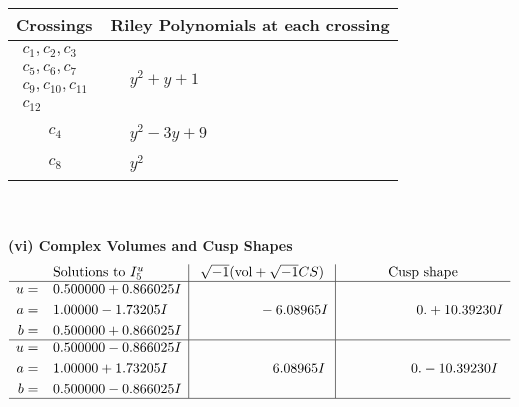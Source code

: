 \documentclass[1p]{elsarticle_modified}
\theoremstyle{definition}
\newcommand{\I}{\sqrt{-1}}
\begin{document}
\begin{tabular}{m{50pt}|m{274pt}}
Crossings & \hspace{64pt}Riley Polynomials at each crossing \\
\hline $$\begin{aligned}c_{1},c_{2},c_{3}\\c_{5},c_{6},c_{7}\\c_{9},c_{10},c_{11}\\c_{12}\end{aligned}$$&$\begin{aligned}
&y^2+y+1
\end{aligned}$\\
\hline $$\begin{aligned}c_{4}\end{aligned}$$&$\begin{aligned}
&y^2-3 y+9
\end{aligned}$\\
\hline $$\begin{aligned}c_{8}\end{aligned}$$&$\begin{aligned}
&y^2
\end{aligned}$\\
\hline
\end{tabular}\\~\\
\newpage\flushleft \textbf{(vi) Complex Volumes and Cusp Shapes}
$$\begin{array}{c|c|c}  
\text{Solutions to }I^u_{5}& \I (\text{vol} + \sqrt{-1}CS) & \text{Cusp shape}\\
 \hline 
\begin{aligned}
u &= \phantom{-}0.500000 + 0.866025 I \\
a &= \phantom{-}1.00000 - 1.73205 I \\
b &= \phantom{-}0.500000 + 0.866025 I\end{aligned}
 & \phantom{-0.000000 } -6.08965 I & \phantom{-0.000000 -}0. + 10.39230 I \\ \hline\begin{aligned}
u &= \phantom{-}0.500000 - 0.866025 I \\
a &= \phantom{-}1.00000 + 1.73205 I \\
b &= \phantom{-}0.500000 - 0.866025 I\end{aligned}
 & \phantom{-0.000000 -}6.08965 I & \phantom{-0.000000 } 0. - 10.39230 I\\
 \hline 
 \end{array}$$\newpage
\newpage\renewcommand{\arraystretch}{1}
\end{document}
